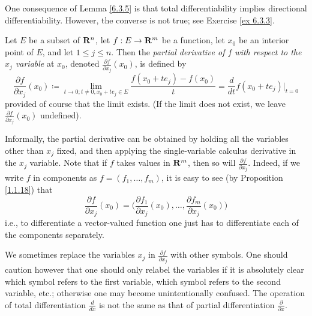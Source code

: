 \begin{remark}\label{6.3.6}
    One consequence of Lemma \ref{6.3.5} is that total differentiability implies directional differentiability.
    However, the converse is not true;
    see Exercise \ref{ex 6.3.3}.
\end{remark}

\begin{definition}\label{6.3.7}
    Let \(E\) be a subset of \(\mathbf{R}^n\), let \(f : E \to \mathbf{R}^m\) be a function, let \(x_0\) be an interior point of \(E\), and let \(1 \leq j \leq n\).
    Then the \emph{partial derivative of \(f\) with respect to the \(x_j\) variable} at \(x_0\), denoted \(\frac{\partial f}{\partial x_j}(x_0)\), is defined by
    \[
        \frac{\partial f}{\partial x_j}(x_0) \coloneqq \lim_{t \to 0 ; t \neq 0, x_0 + t e_j \in E} \frac{f(x_0 + t e_j) - f(x_0)}{t} = \frac{d}{dt} f(x_0 + t e_j)|_{t = 0}
    \]
    provided of course that the limit exists.
    (If the limit does not exist, we leave \(\frac{\partial f}{\partial x_j}(x_0)\) undefined).
\end{definition}

\begin{additional corollary}\label{ac 6.3.1}
Informally, the partial derivative can be obtained by holding all the variables other than \(x_j\) fixed, and then applying the single-variable calculus derivative in the \(x_j\) variable.
Note that if \(f\) takes values in \(\mathbf{R}^m\), then so will \(\frac{\partial f}{\partial x_j}\).
Indeed, if we write \(f\) in components as \(f = (f_1, \dots, f_m)\), it is easy to see (by Proposition \ref{1.1.18}) that
\[
    \frac{\partial f}{\partial x_j}(x_0) = \bigg(\frac{\partial f_1}{\partial x_j}(x_0), \dots, \frac{\partial f_m}{\partial x_j}(x_0)\bigg)
\]
i.e., to differentiate a vector-valued function one just has to differentiate each of the components separately.
\end{additional corollary}

\begin{note}
    We sometimes replace the variables \(x_j\) in \(\frac{\partial f}{\partial x_j}\) with other symbols.
    One should caution however that one should only relabel the variables if it is absolutely clear which symbol refers to the first variable, which symbol refers to the second variable, etc.;
    otherwise one may become unintentionally confused.
    The operation of total differentiation \(\frac{d}{dx}\) is not the same as that of partial differentiation \(\frac{\partial}{\partial x}\).
\end{note}

